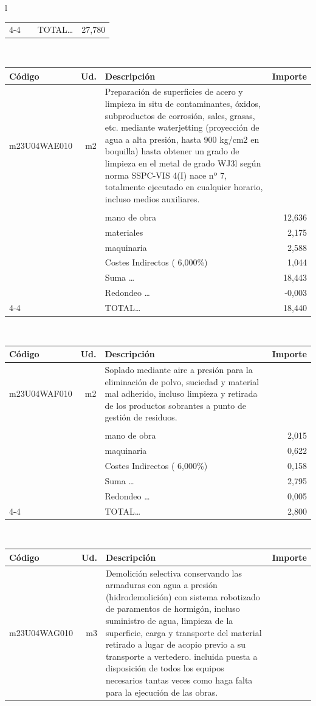 \documentclass{book}%
\begin{document}
\begin{longtable}{l}
\begin{tabular}{l r p{60mm} r}
\cline{4-4}%
&&TOTAL\ldots&    27,780\\%
\end{tabular}\\%
\begin{tabular}{l r p{60mm} r}%
Código&Ud.&Descripción&Importe\\%
\hline%
m23U04WAE010&m2&Preparación de superficies de acero y limpieza in situ de contaminantes, óxidos, subproductos de corrosión, sales, grasas, etc. mediante waterjetting (proyección de agua a alta presión, hasta 900 kg/cm2 en boquilla) hasta obtener un grado de limpieza en el metal de grado WJ3l según norma SSPC{-}VIS 4(I) nace nº 7, totalmente ejecutado en cualquier horario, incluso medios auxiliares.&\\%
&&&\\%
&&mano de obra&    12,636\\%
&&materiales&     2,175\\%
&&maquinaria&     2,588\\%
&&Costes Indirectos (     6,000\%)&     1,044\\%
&&Suma \ldots&    18,443\\%
&&Redondeo \ldots&    {-}0,003\\%
\cline{4-4}%
&&TOTAL\ldots&    18,440\\%
\end{tabular}\\%
\begin{tabular}{l r p{60mm} r}%
Código&Ud.&Descripción&Importe\\%
\hline%
m23U04WAF010&m2&Soplado mediante aire a presión para la eliminación de polvo, suciedad y material mal adherido, incluso limpieza y retirada de los productos sobrantes a punto de gestión de residuos.&\\%
&&&\\%
&&mano de obra&     2,015\\%
&&maquinaria&     0,622\\%
&&Costes Indirectos (     6,000\%)&     0,158\\%
&&Suma \ldots&     2,795\\%
&&Redondeo \ldots&     0,005\\%
\cline{4-4}%
&&TOTAL\ldots&     2,800\\%
\end{tabular}\\%
\begin{tabular}{l r p{60mm} r}%
Código&Ud.&Descripción&Importe\\%
\hline%
m23U04WAG010&m3&Demolición selectiva conservando las armaduras con agua a presión (hidrodemolición) con sistema robotizado de paramentos de hormigón, incluso suministro de agua, limpieza de la superficie, carga y transporte del material retirado a lugar de acopio previo a su transporte a vertedero. incluida puesta a disposición de todos los equipos necesarios tantas veces como haga falta para la ejecución de las obras.&\\%

\end{tabular}
\end{longtable}
\end{document}
